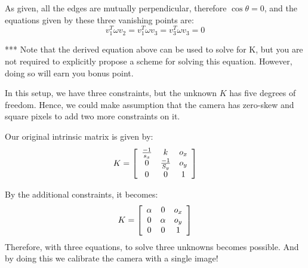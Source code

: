 \begin{questions}
\begin{parts}
\begin{subparts}
\begin{solution}
        As given, all the edges are mutually perpendicular, therefore $\cos \theta = 0$, and the equations given by these three vanishing points are:
        \begin{equation}
            v  _ { 1 } ^ { T  } \omega  v  _  2  = v  _ { 1 } ^ { T  } \omega  v  _  {3} = v  _ { 3 } ^ { T  } \omega  v  _  {3} =0
        \end{equation}
    \end{solution}
    
    \subpart
    *** Note that the derived equation above can be used to solve for K, but you are not required to explicitly propose a scheme for solving this equation. However, doing so will earn you bonus point.
    
    \begin{solution}
        In this setup, we have three constraints, but the unknown $K$ has five degrees of freedom. Hence, we could make assumption that the camera has zero-skew and square pixels to add two more constraints on it.
        
        Our original intrinsic matrix is given by:
        \begin{equation}
            K = \left[ \begin{array} { c c c } { \frac { - 1 } { s _ { x } } } & { k } & {  { o } _ { x } } \\ { 0 } & { \frac { - 1 } { S _ { y } } } & {  { o } _ { y } } \\ { 0 } & { 0 } & { 1 } \end{array} \right]
        \end{equation}
        
        By the additional constraints, it becomes:
        \[
            K = \left[ \begin{array} { c c c } { \alpha } & { 0 } & {  { o } _ { x } } \\ { 0 } & { \alpha } & {  { o } _ { y } } \\ { 0 } & { 0 } & { 1 } \end{array} \right]
        \]
        Therefore, with three equations, to solve three unknowns becomes possible. And by doing this we calibrate the camera with a single image!
    \end{solution}
\end{subparts}


\end{parts}
\end{questions}

